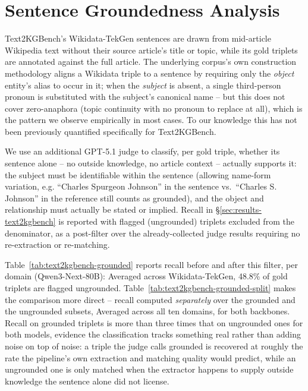 \documentclass[11pt]{article}
\begin{document}
\section{Sentence Groundedness Analysis}
\label{sec:appendix-groundedness}

Text2KGBench's Wikidata-TekGen sentences are drawn from mid-article Wikipedia text without their source article's title or topic, while its gold triplets are annotated against the full article. The underlying corpus's own construction methodology \citep{agarwal2021tekgen} aligns a Wikidata triple to a sentence by requiring only the \emph{object} entity's alias to occur in it; when the \emph{subject} is absent, a single third-person pronoun is substituted with the subject's canonical name -- but this does not cover zero-anaphora (topic continuity with no pronoun to replace at all), which is the pattern we observe empirically in most cases. To our knowledge this has not been previously quantified specifically for Text2KGBench.

We use an additional GPT-5.1 judge to classify, per gold triple, whether its sentence alone -- no outside knowledge, no article context -- actually supports it: the subject must be identifiable within the sentence (allowing name-form variation, e.g. ``Charles Spurgeon Johnson'' in the sentence vs.\ ``Charles S. Johnson'' in the reference still counts as grounded), and the object and relationship must actually be stated or implied. Recall in \S\ref{sec:results-text2kgbench} is reported with flagged (ungrounded) triplets excluded from the denominator, as a post-filter over the already-collected judge results requiring no re-extraction or re-matching.

Table~\ref{tab:text2kgbench-grounded} reports recall before and after this filter, per domain (Qwen3-Next-80B): Averaged across Wikidata-TekGen, 48.8\% of gold triplets are flagged ungrounded. Table~\ref{tab:text2kgbench-grounded-split} makes the comparison more direct -- recall computed \emph{separately} over the grounded and the ungrounded subsets, Averaged across all ten domains, for both backbones. Recall on grounded triplets is more than three times that on ungrounded ones for both models, evidence the classification tracks something real rather than adding noise on top of noise: a triple the judge calls grounded is recovered at roughly the rate the pipeline's own extraction and matching quality would predict, while an ungrounded one is only matched when the extractor happens to supply outside knowledge the sentence alone did not license.
\end{document}
